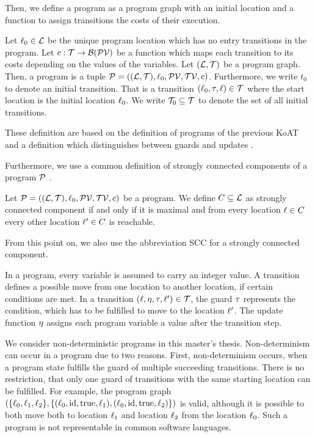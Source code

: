 Then, we define a program as a program graph with an initial location and a function to assign transitions the costs of their execution.

\begin{definition}[Program] 
  Let $\ell_0 \in \mathcal{L}$ be the unique program location which has no entry transitions in the program.
  Let $c: \mathcal{T} \rightarrow \mathcal{B}(\mathcal{PV})$ be a function which maps each transition to its costs depending on the values of the variables.
  Let $(\mathcal{L}, \mathcal{T})$ be a program graph.
  Then, a program is a tuple $\mathcal{P} = ((\mathcal{L}, \mathcal{T}), \ell_0, \mathcal{PV}, \mathcal{TV}, c)$.
  Furthermore, we write $t_0$ to denote an initial transition.
  That is a transition $(\ell_0, \tau, \ell) \in \mathcal{T}$ where the start location is the initial location $\ell_0$.
  We write $\mathcal{T}_0 \subseteq \mathcal{T}$ to denote the set of all initial transitions.
\end{definition}

These definition are based on the definition of programs of the previous KoAT \cite{koat} and a definition which distinguishes between guards and updates \cite{lowerruntime}.

Furthermore, we use a common definition of strongly connected components of a program $\mathcal{P}$ \cite{sccs}.

\begin{definition}
  Let $\mathcal{P} = ((\mathcal{L}, \mathcal{T}), \ell_0, \mathcal{PV}, \mathcal{TV}, c)$ be a program.
  We define $C \subseteq \mathcal{L}$ as strongly connected component if and only if it is maximal and from every location $\ell \in C$ every other location $\ell' \in C$ is reachable.
\end{definition}

From this point on, we also use the abbreviation SCC for a strongly connected component.

In a program, every variable is assumed to carry an integer value.
A transition defines a possible move from one location to another location, if certain conditions are met.
In a transition $(\ell,\eta,\tau,\ell') \in \mathcal{T}$, the guard $\tau$ represents the condition, which has to be fulfilled to move to the location $\ell'$.
The update function $\eta$ assigns each program variable a value after the transition step.

We consider non-deterministic programs in this master's thesis.
Non-determinism can occur in a program due to two reasons.
First, non-determinism occurs, when a program state fulfills the guard of multiple succeeding transitions. 
There is no restriction, that only one guard of transitions with the same starting location can be fulfilled.
For example, the program graph $(\lbrace \ell_0,\ell_1,\ell_2 \rbrace,\lbrace (\ell_0,\text{id},\text{true},\ell_1),(\ell_0,\text{id},\text{true},\ell_2) \rbrace)$ is valid, although it is possible to both move both to location $\ell_1$ and location $\ell_2$ from the location $\ell_0$.
Such a program is not representable in common software languages.

